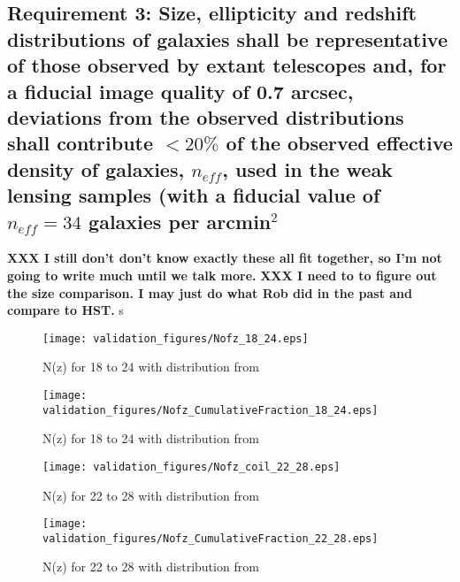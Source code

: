 \documentclass[]{article}
\begin{document}
\subsection{Requirement 3: Size, ellipticity and redshift distributions of galaxies shall be representative of those observed by extant
telescopes and, for a fiducial image quality of 0.7 arcsec, deviations from the observed distributions shall
contribute $< 20\%$ of the observed effective density of galaxies, $n_{eff}$, used in the weak lensing samples (with a fiducial value of
$n_{eff} = 34$ galaxies per arcmin$^2$}
{\bf XXX I still don't don't know exactly these all fit together, so I'm not going to write much until we talk more.}
{\bf XXX I need to to figure out the size comparison.  I may just do what Rob did in the past and compare to HST.}
s%
\begin{figure}
\centering
\texttt{[image: validation\_figures/Nofz\_18\_24.eps]}
\caption{N(z) for 18 to 24 with distribution from \cite{coil}\label{fig:nofz18_24}}
\end{figure}
\begin{figure}
\centering
\texttt{[image: validation\_figures/Nofz\_CumulativeFraction\_18\_24.eps]}
\caption{N(z) for 18 to 24 with distribution from \cite{coil}\label{fig:nofz18_24_ratio}}
\end{figure}
\begin{figure}
\centering
\texttt{[image: validation\_figures/Nofz\_coil\_22\_28.eps]}
\caption{N(z) for 22 to 28 with distribution from \cite{coil}\label{fig:nofz22_28}}
\end{figure}
\begin{figure}
\centering
\texttt{[image: validation\_figures/Nofz\_CumulativeFraction\_22\_28.eps]}
\caption{N(z) for 22 to 28 with distribution from \cite{coil}\label{fig:nofz22_28_ratio}}
\end{figure}
\end{document}

